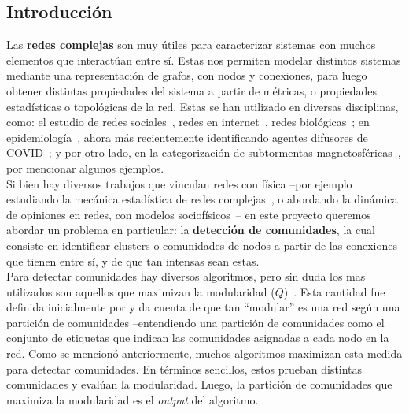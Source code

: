 \documentclass{proyectotesis}
\begin{document}
\subsection{Introducción}
Las \textbf{redes complejas} son muy útiles para caracterizar sistemas con muchos elementos que interactúan entre sí. Estas nos permiten modelar distintos sistemas mediante una representación de grafos, con nodos y conexiones, para luego obtener distintas propiedades del sistema a partir de métricas, o propiedades estadísticas o topológicas de la red. Estas se han utilizado en diversas disciplinas, como: el estudio de redes sociales~\cite{newman_structure_2003, cantwell_friendship_2021}, redes en internet~\cite{newman_structure_2003}, redes biológicas~\cite{newman_structure_2003, da_fontoura_costa_complex_2008}; en epidemiología~\cite{karrer_competing_2011}, ahora más recientemente identificando agentes difusores de COVID~\cite{montes-orozco_identification_2020}; y por otro lado, en la categorización de subtormentas magnetosféricas~\cite{dods_network_2015}, por mencionar algunos ejemplos.\\

Si bien hay diversos trabajos que vinculan redes con física --por ejemplo estudiando la mecánica estadística de redes complejas~\cite{albert_statistical_2001, pastor-satorras_statistical_2003}, o abordando la dinámica de opiniones en redes, con modelos sociofísicos~\cite{suchecki_conservation_2005, castellano_statistical_2009}-- en este proyecto queremos abordar un problema en particular: la \textbf{detección de comunidades}, la cual consiste en identificar clusters o comunidades de nodos a partir de las conexiones que tienen entre sí, y de que tan intensas sean estas.\\


Para detectar comunidades hay diversos algoritmos, pero sin duda los mas utilizados son aquellos que maximizan la modularidad ($Q$)~\cite{newman_fast_2004, clauset_finding_2004, duch_community_2005, blondel_fast_2008, arab_modularity_2012, chen_community_2014}. Esta cantidad fue definida inicialmente por \citet{newman_finding_2004} y da cuenta de que tan ``modular'' es una red según una partición de comunidades --entendiendo una partición de comunidades como el conjunto de etiquetas que indican las comunidades asignadas a cada nodo en la red. Como se mencionó anteriormente, muchos algoritmos maximizan esta medida para detectar comunidades. En términos sencillos, estos prueban distintas comunidades y evalúan la modularidad. Luego, la partición de comunidades que maximiza la modularidad es el \textit{output} del algoritmo.\\
\end{document}
